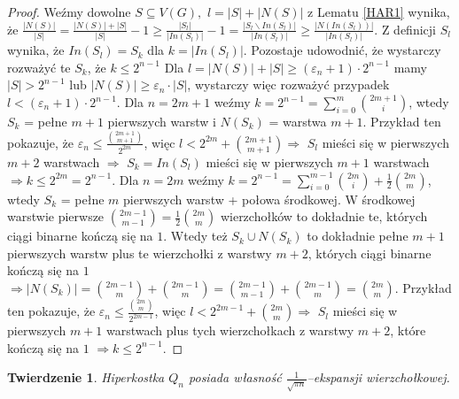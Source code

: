 \documentclass{pracamgr}
\newtheorem{theorem}{Twierdzenie}[chapter]
\begin{document}
   \begin{proof}
    Weźmy dowolne $S\subseteq V(G),$ $l=|S|+|N(S)|$ z Lematu \ref{HAR1} wynika, że
    $\frac{|N(S)|}{|S|}=\frac{|N(S)|+|S|}{|S|}-1\ge\frac{|S_l|}{|In(S_l)|}-1=\frac{|S_l\backslash In(S_l)|}{|In(S_l)|}\ge\frac{|N(In(S_l))|}{|In(S_l)|}$.
    Z definicji $S_l$ wynika, że $In(S_l)=S_k$ dla $k=|In(S_l)|$.\newline
    Pozostaje udowodnić, że wystarczy rozważyć te $S_k$, że $k\le2^{n-1}$\newline
    Dla $l=|N(S)|+|S|\ge(\varepsilon_n+1)\cdot 2^{n-1}$ mamy $|S|>2^{n-1}$ lub $|N(S)|\ge\varepsilon_n\cdot|S|$, wystarczy więc rozważyć przypadek
    $l<(\varepsilon_n+1)\cdot 2^{n-1}$.\newline
    Dla $n=2m+1$ weźmy $k=2^{n-1}=\sum_{i=0}^{m}{2m+1 \choose i}$, wtedy $S_k$ = pełne $m+1$ pierwszych warstw i $N(S_k)$ = warstwa $m+1$.
    Przykład ten pokazuje, że $\varepsilon_n\le\frac{{2m+1 \choose m+1}}{2^{2m}}$,
    więc $l<2^{2m}+{2m+1 \choose m+1}\Rightarrow$ $S_l$ mieści się w pierwszych $m+2$ warstwach
    $\Rightarrow$ $S_k=In(S_l)$ mieści się w pierwszych $m+1$ warstwach $\Rightarrow k\le 2^{2m}=2^{n-1}$.\newline
    Dla $n=2m$ weźmy $k=2^{n-1}=\sum_{i=0}^{m-1}{2m \choose i}+\frac{1}{2}{2m\choose m}$, wtedy $S_k$ = pełne $m$ pierwszych warstw + połowa środkowej.
    W środkowej warstwie pierwsze ${2m-1\choose m-1}=\frac{1}{2}{2m \choose m}$ wierzchołków to dokładnie te, których ciągi binarne kończą się na $1$.
    Wtedy też $S_k\cup N(S_k)$ to dokładnie pełne $m+1$ pierwszych warstw plus te wierzchołki z warstwy $m+2$, których ciągi binarne kończą się na $1$
    $\Rightarrow |N(S_k)|={2m-1\choose m}+{2m-1\choose m}={2m-1\choose m-1}+{2m-1 \choose m}={2m\choose m}$.
    Przykład ten pokazuje, że $\varepsilon_n\le\frac{{2m \choose m}}{2^{2m-1}}$,
    więc $l<2^{2m-1}+{2m \choose m}\Rightarrow$ $S_l$ mieści się w pierwszych $m+1$ warstwach plus tych wierzchołkach z warstwy $m+2$, które kończą się na $1$
    $\Rightarrow k\le2^{n-1}$.
   \end{proof}
   \begin{theorem}\label{ekspansja kostki}
    Hiperkostka $Q_n$ posiada własność $\frac{1}{\sqrt{\pi n}}$--ekspansji wierzchołkowej.
   \end{theorem}
\end{document}
